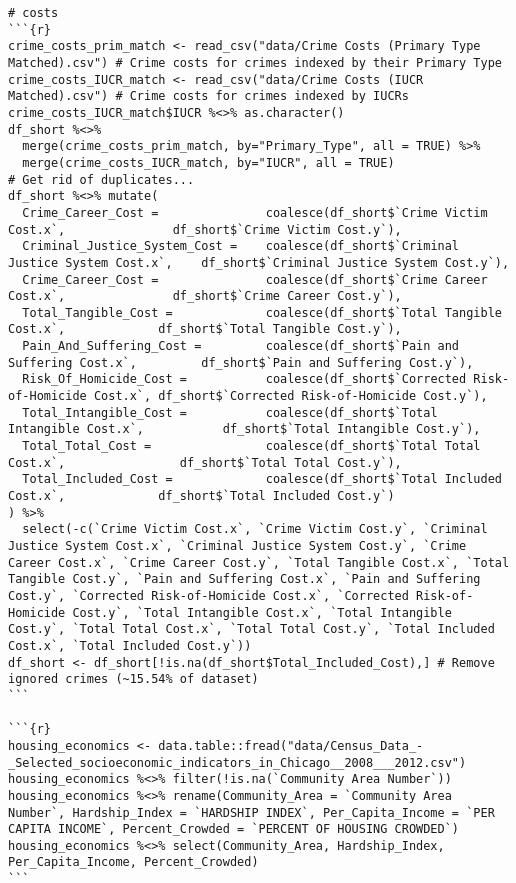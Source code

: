 \documentclass{article}
\begin{document}
\begin{verbatim}
# costs
```{r}
crime_costs_prim_match <- read_csv("data/Crime Costs (Primary Type Matched).csv") # Crime costs for crimes indexed by their Primary Type
crime_costs_IUCR_match <- read_csv("data/Crime Costs (IUCR Matched).csv") # Crime costs for crimes indexed by IUCRs
crime_costs_IUCR_match$IUCR %<>% as.character()
df_short %<>%
  merge(crime_costs_prim_match, by="Primary_Type", all = TRUE) %>%
  merge(crime_costs_IUCR_match, by="IUCR", all = TRUE)
# Get rid of duplicates...
df_short %<>% mutate(
  Crime_Career_Cost =               coalesce(df_short$`Crime Victim Cost.x`,               df_short$`Crime Victim Cost.y`),
  Criminal_Justice_System_Cost =    coalesce(df_short$`Criminal Justice System Cost.x`,    df_short$`Criminal Justice System Cost.y`),
  Crime_Career_Cost =               coalesce(df_short$`Crime Career Cost.x`,               df_short$`Crime Career Cost.y`),
  Total_Tangible_Cost =             coalesce(df_short$`Total Tangible Cost.x`,             df_short$`Total Tangible Cost.y`),
  Pain_And_Suffering_Cost =         coalesce(df_short$`Pain and Suffering Cost.x`,         df_short$`Pain and Suffering Cost.y`),
  Risk_Of_Homicide_Cost =           coalesce(df_short$`Corrected Risk-of-Homicide Cost.x`, df_short$`Corrected Risk-of-Homicide Cost.y`),
  Total_Intangible_Cost =           coalesce(df_short$`Total Intangible Cost.x`,           df_short$`Total Intangible Cost.y`),
  Total_Total_Cost =                coalesce(df_short$`Total Total Cost.x`,                df_short$`Total Total Cost.y`),
  Total_Included_Cost =             coalesce(df_short$`Total Included Cost.x`,             df_short$`Total Included Cost.y`)
) %>%
  select(-c(`Crime Victim Cost.x`, `Crime Victim Cost.y`, `Criminal Justice System Cost.x`, `Criminal Justice System Cost.y`, `Crime Career Cost.x`, `Crime Career Cost.y`, `Total Tangible Cost.x`, `Total Tangible Cost.y`, `Pain and Suffering Cost.x`, `Pain and Suffering Cost.y`, `Corrected Risk-of-Homicide Cost.x`, `Corrected Risk-of-Homicide Cost.y`, `Total Intangible Cost.x`, `Total Intangible Cost.y`, `Total Total Cost.x`, `Total Total Cost.y`, `Total Included Cost.x`, `Total Included Cost.y`))
df_short <- df_short[!is.na(df_short$Total_Included_Cost),] # Remove ignored crimes (~15.54% of dataset)
```

```{r}
housing_economics <- data.table::fread("data/Census_Data_-_Selected_socioeconomic_indicators_in_Chicago__2008___2012.csv")
housing_economics %<>% filter(!is.na(`Community Area Number`))
housing_economics %<>% rename(Community_Area = `Community Area Number`, Hardship_Index = `HARDSHIP INDEX`, Per_Capita_Income = `PER CAPITA INCOME`, Percent_Crowded = `PERCENT OF HOUSING CROWDED`)
housing_economics %<>% select(Community_Area, Hardship_Index, Per_Capita_Income, Percent_Crowded)
```


\end{verbatim}
\end{document}
